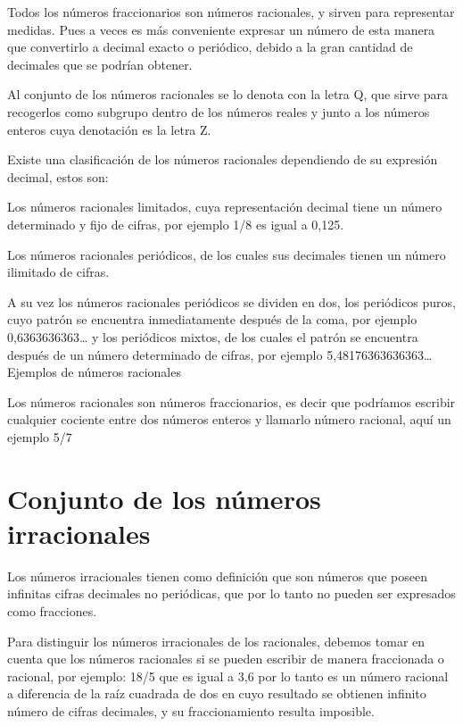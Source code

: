 \documentclass{article}
\begin{document}
Todos los n\'umeros fraccionarios son n\'umeros racionales, y sirven para representar medidas. Pues a veces es m\'as conveniente expresar un n\'umero de esta manera que convertirlo a decimal exacto o peri\'odico, debido a la gran cantidad de decimales que se podr\'ian obtener.

Al conjunto de los n\'umeros racionales se lo denota con la letra Q, que sirve para recogerlos como subgrupo dentro de los n\'umeros reales y junto a los n\'umeros enteros cuya denotaci\'on es la letra Z.

Existe una clasificaci\'on de los n\'umeros racionales dependiendo de su expresi\'on decimal, estos son:

Los n\'umeros racionales limitados, cuya representaci\'on decimal tiene un n\'umero determinado y fijo de cifras, por ejemplo 1/8 es igual a 0,125.

Los n\'umeros racionales peri\'odicos, de los cuales sus decimales tienen un n\'umero ilimitado de cifras.

A su vez los n\'umeros racionales peri\'odicos se dividen en dos, los peri\'odicos puros, cuyo patr\'on se encuentra inmediatamente despu\'es de la coma, por ejemplo 0,6363636363{\dots} y los peri\'odicos mixtos, de los cuales el patr\'on se encuentra despu\'es de un n\'umero determinado de cifras, por ejemplo 5,48176363636363{\dots} Ejemplos de n\'umeros racionales

Los n\'umeros racionales son n\'umeros fraccionarios, es decir que podr\'iamos escribir cualquier cociente entre dos n\'umeros enteros y llamarlo n\'umero racional, aqu\'i un ejemplo 5/7


\bigskip

\section[Conjunto de los n\'umeros irracionales]{Conjunto de los n\'umeros irracionales}

\bigskip

Los n\'umeros irracionales tienen como definici\'on que son n\'umeros que poseen infinitas cifras decimales no peri\'odicas, que por lo tanto no pueden ser expresados como fracciones.

Para distinguir los n\'umeros irracionales de los racionales, debemos tomar en cuenta que los n\'umeros racionales si se pueden escribir de manera fraccionada o racional, por ejemplo: 18/5 que es igual a 3,6 por lo tanto es un n\'umero racional a diferencia de la ra\'iz cuadrada de dos en cuyo resultado se obtienen infinito n\'umero de cifras decimales, y su fraccionamiento resulta imposible.
\end{document}
